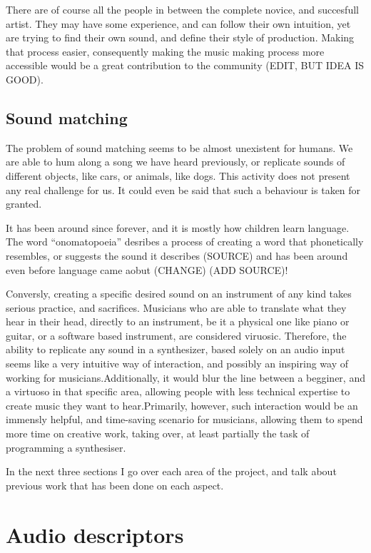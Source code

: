 There are of course all the people in between the complete novice,
and succesfull artist. They may have some experience, and can follow
their own intuition, yet are trying to find their own sound, and
define their style of production. Making that process easier,
consequently making the music making process more accessible would be
a great contribution to the community (EDIT, BUT IDEA IS GOOD).

\subsection{Sound matching}

The problem of sound matching seems to be almost unexistent for
humans. We are able to hum along a song we have heard previously, or
replicate sounds of different objects, like cars, or animals, like
dogs. This activity does not present any real challenge for us. It
could even be said that such a behaviour is taken for
granted.

It has been around since forever, and it is mostly how children learn
language. The word ``onomatopoeia'' desribes a process of creating a
word that phonetically resembles, or suggests the sound it describes
(SOURCE) and has been around even before language came aobut (CHANGE)
(ADD SOURCE)!

Conversly, creating a specific desired sound on an instrument of any
kind takes serious practice, and sacrifices. Musicians who are able to
translate what they hear in their head, directly to an instrument, be
it a physical one like piano or guitar, or a software based
instrument, are considered viruosic. Therefore, the ability to
replicate any sound in a synthesizer, based solely on an audio input
seems like a very intuitive way of interaction, and possibly an
inspiring way of working for musicians.Additionally, it would blur the
line between a begginer, and a virtuoso in that specific area,
allowing people with less technical expertise to create music they
want to hear.Primarily, however, such interaction would be an immensly
helpful, and time-saving scenario for musicians, allowing them to
spend more time on creative work, taking over, at least partially the
task of programming a synthesiser.

In the next three sections I go over each area of the project, and talk
about previous work that has been done on each aspect.

\section{Audio descriptors}

